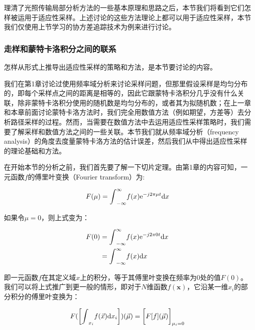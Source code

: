理清了光照传输局部分析方法的一些基本原理和思路之后，本节我们将看到它们怎 样被运用于适应性采样。上述讨论的这些方法理论上都可以用于适应性采样，本节我们仅使用上节学习的协方差追踪技术为例来进行讨论。






\subsubsection{走样和蒙特卡洛积分之间的联系}
怎样从形式上推导出适应性采样的策略和方法，是本节要讨论的内容。

我们在第1章讨论过使用频率域分析来讨论采样问题，但那里假设采样是均匀分布的，即每个采样点之间的距离是相等的，因此它跟蒙特卡洛积分几乎没有什么关联，除非蒙特卡洛积分使用的随机数是均匀分布的，或者其为拟随机数；在上一章和本章前面讨论蒙特卡洛方法时，我们完全用数值方法（例如期望，方差等）去分析路径采样的过程。然而，当需要在数值方法中去运用适应性采样策略时，我们需要了解采样和数值方法之间的一些关联。本节我们就从频率域分析（frequency analysis）的角度去度量蒙特卡洛方法的估计误差，然后我们从中得出适应性采样的理论基础和方法。

在开始本节的分析之前，我们首先要了解一下切片定理。由第1章的内容可知，一元函数$f$的傅里叶变换（Fourier transform）为:

\begin{equation}
	F(\mu)={\rm \int}^{\infty}_{-\infty}f(x){\rm e}^{-j2\pi\mu t}{\rm d}x
\end{equation}

\noindent 如果令$\mu=0$，则上式变为：

\begin{equation}
\begin{aligned}
	F(0)&={\rm \int}^{\infty}_{-\infty}f(x){\rm e}^{-j2\pi 0 t}{\rm d}x\\
	&={\rm \int}^{\infty}_{-\infty}f(x){\rm d}x
\end{aligned}
\end{equation}

\noindent 即一元函数$f$在其定义域$x$上的积分，等于其傅里叶变换在频率为$0$处的值$F(0)$。我们可以将上式推广到更一般的情形，即对于$N$维函数$f(\mathbf{x})$，它沿某一维$x_i$的部分积分的傅里叶变换为：

\begin{equation}
	F(\bigg[{\rm \int}_{x_i}f(\vec{x}){\rm d}x_i\bigg])(\vec{\mu})=\bigg[F[f](\vec{\mu})\bigg]_{\mu_i=0}
\end{equation}

